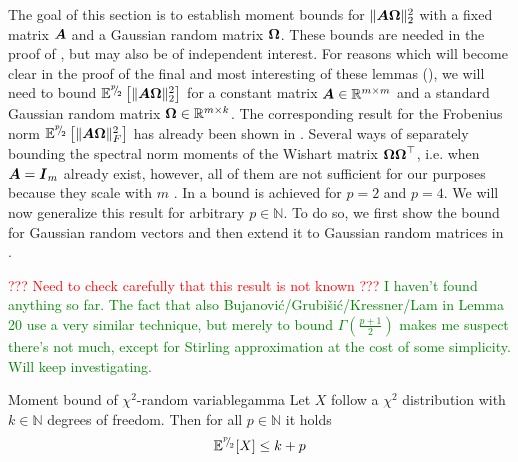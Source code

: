 \documentclass[12pt]{article}
\begin{document}
The goal of this section is to establish moment bounds for $\lVert \boldsymbol{A} \boldsymbol{\Omega} \rVert _2^2$ with a fixed matrix $\boldsymbol{A}$ and a Gaussian random matrix $\boldsymbol{\Omega}$. These bounds are needed in the proof of , but may also be of independent interest. For reasons which will become clear in the proof of the final and most interesting of these lemmas (), we will need to bound $\mathbb{E}^{{}^{p}{\mskip -5mu/\mskip -3mu}_{2}}\left[\lVert \boldsymbol{A} \boldsymbol{\Omega} \rVert _2^2 \right]$ for a constant matrix $\boldsymbol{A} \in \mathbb{R}^{m \times m}$ and a standard Gaussian random matrix $\boldsymbol{\Omega} \in \mathbb{R}^{m \times k}$. The corresponding result for the Frobenius norm $\mathbb{E}^{{}^{p}{\mskip -5mu/\mskip -3mu}_{2}}\left[\lVert \boldsymbol{A} \boldsymbol{\Omega} \rVert _F^2 \right]$ has already been shown in \cite[Lemma 3]{kressner-2024-randomized-lowrank}. Several ways of separately bounding the spectral norm moments of the Wishart matrix $\boldsymbol{\Omega} \boldsymbol{\Omega}^{\top}$, i.e. when $\boldsymbol{A} = \boldsymbol{I}_m$ already exist, however, all of them are not sufficient for our purposes because they scale with $m$ \cite{chen-2005-condition-numbers, edelman-1988-eigenvalues-condition, james-1964-distributions-matrix}. In \cite[Lemma B.1]{tropp-2023-randomized-algorithms} a bound is achieved for $p = 2$ and $p = 4$. We will now generalize this result for arbitrary $p \in \mathbb{N}$. To do so, we first show the bound for Gaussian random vectors and then extend it to Gaussian random matrices in .


\textcolor{red}{??? Need to check carefully that this result is not known ???} \textcolor{green}{I haven't found anything so far. The fact that also Bujanović/Grubišić/Kressner/Lam in Lemma 20 use a very similar technique, but merely to bound $\Gamma(\frac{p+1}{2})$ makes me suspect there's not much, except for Stirling approximation at the cost of some simplicity. Will keep investigating.}

\begin{lemma}{Moment bound of $\chi^2$-random variable}{gamma}
    Let $X$ follow a $\chi^2$ distribution with $k \in \mathbb{N}$ degrees of freedom. Then for all $p \in \mathbb{N}$ it holds
    \begin{equation}
        \mathbb{E}^{{}^{p}{\mskip -5mu/\mskip -3mu}_{2}}[X] \leq k + p
    \end{equation}
\end{lemma}
\end{document}
